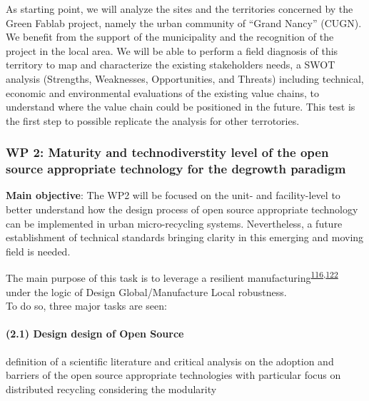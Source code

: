 \documentclass[
  12pt,
  a4paperpaper,
  onecolumn]{article}
\let\oldparagraph\paragraph
\renewcommand{\paragraph}[1]{\oldparagraph{#1}\mbox{}}
\let\paragraph\oldparagraph
\begin{document}
As starting point, we will analyze the sites and the territories
concerned by the Green Fablab project, namely the urban community of
``Grand Nancy'' (CUGN). We benefit from the support of the municipality
and the recognition of the project in the local area. We will be able to
perform a field diagnosis of this territory to map and characterize the
existing stakeholders needs, a SWOT analysis (Strengths, Weaknesses,
Opportunities, and Threats) including technical, economic and
environmental evaluations of the existing value chains, to understand
where the value chain could be positioned in the future. This test is
the first step to possible replicate the analysis for other terrotories.

\small

\normalsize

\hypertarget{wp-2-maturity-and-technodiverstity-level-of-the-open-source-appropriate-technology-for-the-degrowth-paradigm}{%
\subsubsection{WP 2: Maturity and technodiverstity level of the open
source appropriate technology for the degrowth
paradigm}\label{wp-2-maturity-and-technodiverstity-level-of-the-open-source-appropriate-technology-for-the-degrowth-paradigm}}

\textbf{Main objective}: The WP2 will be focused on the unit- and
facility-level to better understand how the design process of open
source appropriate technology can be implemented in urban
micro-recycling systems. Nevertheless, a future establishment of
technical standards bringing clarity in this emerging and moving field
is needed.

The main purpose of this task is to leverage a resilient
manufacturing\textsuperscript{\protect\hyperlink{ref-xu2021e}{116},\protect\hyperlink{ref-zhang2011}{122}}
under the logic of Design Global/Manufacture Local robustness.\\
To do so, three major tasks are seen:

\hypertarget{design-design-of-open-source}{%
\paragraph{(2.1) Design design of Open
Source}\label{design-design-of-open-source}}

definition of a scientific literature and critical analysis on the
adoption and barriers of the open source appropriate technologies with
particular focus on distributed recycling considering the modularity
\end{document}
